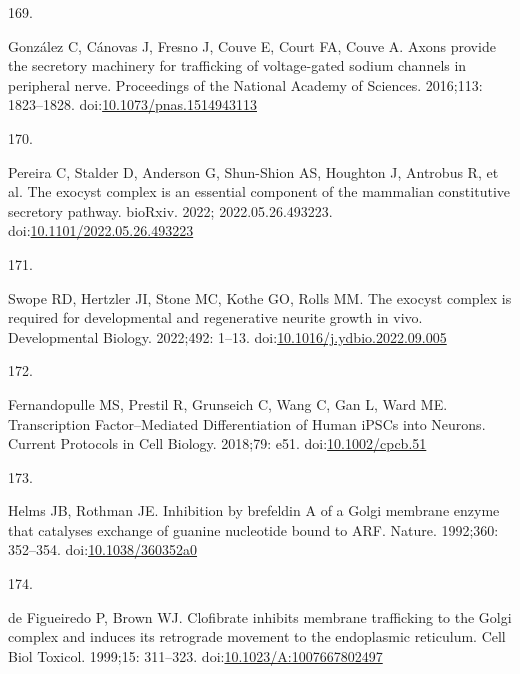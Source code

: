 \documentclass[
  12pt,
  a4paper,
]{book}
\newlength{\cslhangindent}
\newlength{\csllabelwidth}
\newlength{\cslentryspacingunit} %
\newenvironment{CSLReferences}[2] %
 {%
  \setlength{\parindent}{0pt}
  \ifodd #1
  \let\oldpar\par
  \def\par{\hangindent=\cslhangindent\oldpar}
  \fi
  \setlength{\parskip}{#2\cslentryspacingunit}
 }%
 {}
\newcommand{\CSLLeftMargin}[1]{\parbox[t]{\csllabelwidth}{#1}}
\newcommand{\CSLRightInline}[1]{\parbox[t]{\linewidth - \csllabelwidth}{#1}\break}
\begin{document}
\begin{CSLReferences}{0}{0}
\leavevmode{}%
\CSLLeftMargin{169. }%
\CSLRightInline{González C, Cánovas J, Fresno J, Couve E, Court FA, Couve A. Axons provide the secretory machinery for trafficking of voltage-gated sodium channels in peripheral nerve. Proceedings of the National Academy of Sciences. 2016;113: 1823--1828. doi:\href{https://doi.org/10.1073/pnas.1514943113}{10.1073/pnas.1514943113}}

\leavevmode{}%
\CSLLeftMargin{170. }%
\CSLRightInline{Pereira C, Stalder D, Anderson G, Shun-Shion AS, Houghton J, Antrobus R, et al. The exocyst complex is an essential component of the mammalian constitutive secretory pathway. bioRxiv. 2022; 2022.05.26.493223. doi:\href{https://doi.org/10.1101/2022.05.26.493223}{10.1101/2022.05.26.493223}}

\leavevmode{}%
\CSLLeftMargin{171. }%
\CSLRightInline{Swope RD, Hertzler JI, Stone MC, Kothe GO, Rolls MM. The exocyst complex is required for developmental and regenerative neurite growth in vivo. Developmental Biology. 2022;492: 1--13. doi:\href{https://doi.org/10.1016/j.ydbio.2022.09.005}{10.1016/j.ydbio.2022.09.005}}

\leavevmode{}%
\CSLLeftMargin{172. }%
\CSLRightInline{Fernandopulle MS, Prestil R, Grunseich C, Wang C, Gan L, Ward ME. Transcription {Factor}--{Mediated Differentiation} of {Human iPSCs} into {Neurons}. Current Protocols in Cell Biology. 2018;79: e51. doi:\href{https://doi.org/10.1002/cpcb.51}{10.1002/cpcb.51}}

\leavevmode{}%
\CSLLeftMargin{173. }%
\CSLRightInline{Helms JB, Rothman JE. Inhibition by brefeldin {A} of a {Golgi} membrane enzyme that catalyses exchange of guanine nucleotide bound to {ARF}. Nature. 1992;360: 352--354. doi:\href{https://doi.org/10.1038/360352a0}{10.1038/360352a0}}

\leavevmode{}%
\CSLLeftMargin{174. }%
\CSLRightInline{de Figueiredo P, Brown WJ. Clofibrate inhibits membrane trafficking to the {Golgi} complex and induces its retrograde movement to the endoplasmic reticulum. Cell Biol Toxicol. 1999;15: 311--323. doi:\href{https://doi.org/10.1023/A:1007667802497}{10.1023/A:1007667802497}}


\end{CSLReferences}
\end{document}
